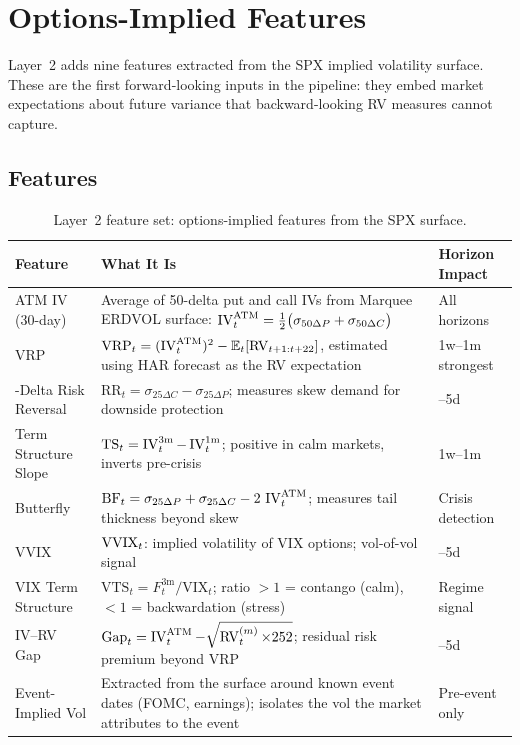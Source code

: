 \chapter{Options-Implied Features}
\label{ch:options-implied}

Layer~2 adds nine features extracted from the SPX implied volatility surface.
These are the first forward-looking inputs in the pipeline: they embed market expectations about future variance that backward-looking RV measures cannot capture.

\section{Features}
\label{sec:implied-features}

\begin{table}[htbp]
\centering
\caption{Layer~2 feature set: options-implied features from the SPX surface.}
\label{tab:implied-features}
\small
\begin{tabular}{%
  >{\raggedright\arraybackslash}p{3.0cm}
  >{\raggedright\arraybackslash}p{6.2cm}
  >{\raggedright\arraybackslash}p{3.0cm}}
\toprule
\textbf{Feature} & \textbf{What It Is} & \textbf{Horizon Impact} \\
\midrule
ATM IV (30-day) &
  Average of 50-delta put and call IVs from Marquee ERDVOL surface: $\operatorname{IV}_t^{\mathrm{ATM}} = \tfrac{1}{2}\bigl(\sigma_{50\Delta P} + \sigma_{50\Delta C}\bigr)$ &
  All horizons \citep{GuKellyXiu2020} \\[8pt]
VRP &
  $\operatorname{VRP}_t = (\operatorname{IV}_t^{\mathrm{ATM}})^2 - \mathbb{E}_t[\operatorname{RV}_{t+1:t+22}]$, estimated using HAR forecast as the RV expectation &
  1w--1m strongest \citep{BTZ2009} \\[8pt]
25-Delta Risk Reversal &
  $\mathrm{RR}_t = \sigma_{25\Delta C} - \sigma_{25\Delta P}$; measures skew demand for downside protection &
  1--5d \\[8pt]
Term Structure Slope &
  $\mathrm{TS}_t = \operatorname{IV}_t^{3\mathrm{m}} - \operatorname{IV}_t^{1\mathrm{m}}$; positive in calm markets, inverts pre-crisis &
  1w--1m \\[8pt]
Butterfly &
  $\mathrm{BF}_t = \sigma_{25\Delta P} + \sigma_{25\Delta C} - 2\,\operatorname{IV}_t^{\mathrm{ATM}}$; measures tail thickness beyond skew &
  Crisis detection \\[8pt]
VVIX &
  $\operatorname{VVIX}_t$: implied volatility of VIX options; vol-of-vol signal &
  1--5d \\[8pt]
VIX Term Structure &
  $\mathrm{VTS}_t = F_t^{3\mathrm{m}} / \mathrm{VIX}_t$; ratio $> 1$ = contango (calm), $< 1$ = backwardation (stress) &
  Regime signal \\[8pt]
IV--RV Gap &
  $\mathrm{Gap}_t = \operatorname{IV}_t^{\mathrm{ATM}} - \sqrt{\operatorname{RV}_t^{(m)} \times 252}$; residual risk premium beyond VRP &
  1--5d \\[8pt]
Event-Implied Vol &
  Extracted from the surface around known event dates (FOMC, earnings); isolates the vol the market attributes to the event &
  Pre-event only \\
\bottomrule
\end{tabular}
\end{table}


